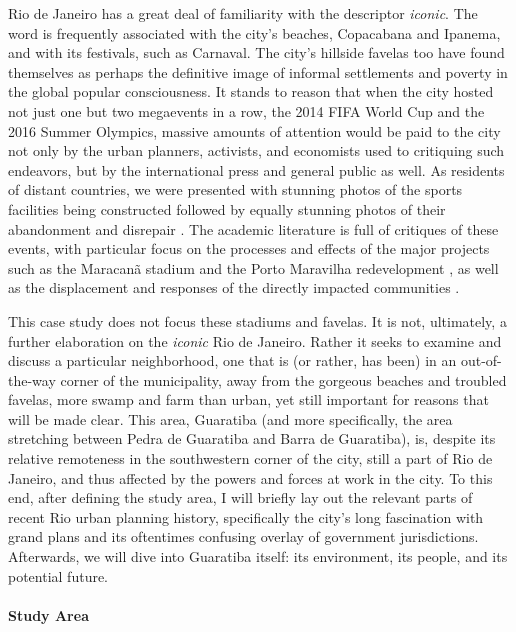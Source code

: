 Rio de Janeiro has a great deal of familiarity with the descriptor \textit{iconic}. The word is frequently associated with the city's beaches, Copacabana and Ipanema, and with its festivals, such as Carnaval. The city's hillside favelas too have found themselves as perhaps the definitive image of informal settlements and poverty in the global popular consciousness. It stands to reason that when the city hosted not just one but two megaevents in a row, the 2014 FIFA World Cup and the 2016 Summer Olympics, massive amounts of attention would be paid to the city not only by the urban planners, activists, and economists used to critiquing such endeavors, but by the international press and general public as well. As residents of distant countries, we were presented with stunning photos of the sports facilities being constructed \cite{umlaufRioCityTransformed2016} followed by equally stunning photos of their abandonment and disrepair \cite{olivaresRioOlympicVenues2017}. The academic literature is full of critiques of these events, with particular focus on the processes and effects of the major projects such as the Maracanã stadium and the Porto Maravilha redevelopment \cite{sanchezMegaeventsUrbanRegeneration2013}, as well as the displacement and responses of the directly impacted communities  \cite{talbotHumanRightsAbuses2018,viehoffPoliticsMegaeventPlanning2016}. 

This case study does not focus these stadiums and favelas. It is not, ultimately, a further elaboration on the \textit{iconic} Rio de Janeiro. Rather it seeks to examine and discuss a particular neighborhood, one that is (or rather, has been) in an out-of-the-way corner of the municipality, away from the gorgeous beaches and troubled favelas, more swamp and farm than urban, yet still important for reasons that will be made clear. This area, Guaratiba (and more specifically, the area stretching between Pedra de Guaratiba and Barra de Guaratiba), is, despite its relative remoteness in the southwestern corner of the city, still a part of Rio de Janeiro, and thus affected by the powers and forces at work in the city. To this end, after defining the study area, I will briefly lay out the relevant parts of recent Rio urban planning history, specifically the city's long fascination with grand plans and its oftentimes confusing overlay of government jurisdictions. Afterwards, we will dive into Guaratiba itself: its environment, its people, and its potential future. 

\paragraph{Study Area} \leavevmode\newline

